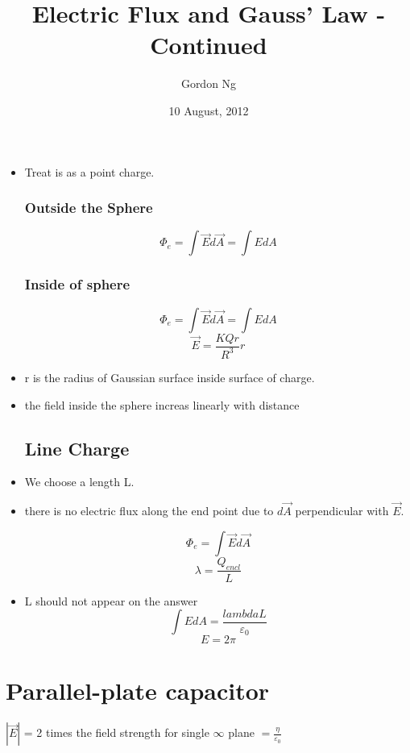 \documentclass[12pt]{article}
\begin{document}
\title{Electric Flux and Gauss' Law - Continued}
\date{10 August, 2012}
\author{Gordon Ng}
\maketitle
\pagebreak
\tableofcontents
\pagebreak
\begin{itemize}
\section{Examples}
\subsection{Sphere of Charge}
\item Treat is as a point charge.
\subsubsection{Outside the Sphere}
\begin{displaymath}
\Phi_e=\int{\vec{E}}d\vec{A}=\int EdA
\end{displaymath}
\subsubsection{Inside of sphere}
\begin{displaymath}
\Phi_e=\int{\vec{E}}d\vec{A}=\int EdA
\end{displaymath}
\begin{displaymath}
\vec{E}=\frac{KQr}{R^3}r
\end{displaymath}
\item r is the radius of Gaussian surface inside surface of charge.
\item the field inside the sphere increas linearly with distance

\subsection{Line Charge}
\item We choose a length L.
\item there is no electric flux along the end point due to $d\vec{A}$ perpendicular with $\vec{E}$.

\begin{displaymath}
\Phi_e=\int{\vec{E}}d\vec{A}
\end{displaymath}
\begin{displaymath}
\lambda = \frac{Q_{encl}}{L}
\end{displaymath}
\item L should not appear on the answer
\begin{displaymath}
\int{E}dA = \frac{lambda L }{\varepsilon_0}
\end{displaymath}
\begin{displaymath}
E = 2 \pi
\end{displaymath}
\end{itemize}
\section{Parallel-plate capacitor}
$|\vec{E}|$ = 2 times the field strength for single $ \infty$ plane $= \frac {\eta}{\varepsilon_0}$
\end{document}
